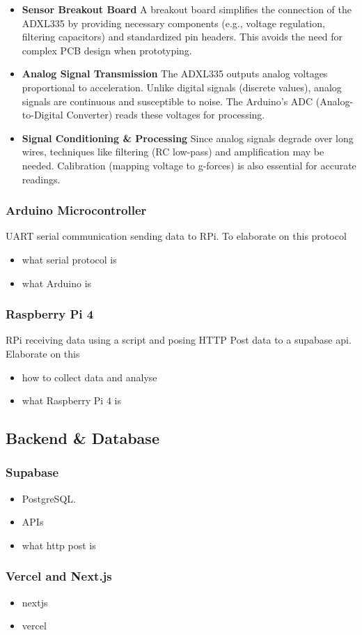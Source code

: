 \begin{itemize}  
	\item \textbf{Sensor Breakout Board}  
	A breakout board simplifies the connection of the ADXL335 by providing necessary components (e.g., voltage regulation, filtering capacitors) and standardized pin headers. This avoids the need for complex PCB design when prototyping.  
	
	\item \textbf{Analog Signal Transmission}  
	The ADXL335 outputs analog voltages proportional to acceleration. Unlike digital signals (discrete values), analog signals are continuous and susceptible to noise. The Arduino's ADC (Analog-to-Digital Converter) reads these voltages for processing.  
	
	\item \textbf{Signal Conditioning \& Processing}  
	Since analog signals degrade over long wires, techniques like filtering (RC low-pass) and amplification may be needed. Calibration (mapping voltage to g-forces) is also essential for accurate readings.  
\end{itemize}




\subsubsection{Arduino Microcontroller}
UART serial communication sending data to RPi. To elaborate on this protocol
\begin{itemize}
\item what serial protocol is
\item what Arduino is
\end{itemize}

\subsubsection{Raspberry Pi 4}
RPi receiving data using a script and posing HTTP Post data to a supabase api. Elaborate on this

\begin{itemize}
\item how to collect data and analyse
\item what Raspberry Pi 4 is
\end{itemize}




\subsection{Backend \& Database}
\subsubsection{Supabase}
\begin{itemize}  
	\item PostgreSQL. 
	\item APIs
	\item what http post is
\end{itemize}  

\subsubsection{Vercel and Next.js}
\begin{itemize}  
	\item nextjs 
	\item vercel
\end{itemize} 